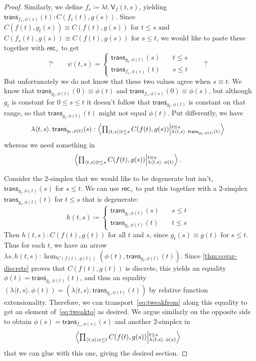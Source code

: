 \documentclass{amsart}
\theoremstyle{plain}
\theoremstyle{definition}
\theoremstyle{remark}
\numberwithin{equation}{section}
\newcommand{\exten}[4]{\left\langle\mathchoice{\textstyle\prod_{#1}}{\textstyle\prod_{#1}}{\scriptstyle\prod_{#1}}{\scriptscriptstyle\prod_{#1}} #2 \middle|^{#3}_{#4}\right\rangle}
\newcommand{\jdeq}{\equiv}
\newcommand{\defeq}{\coloneqq}
\newcommand{\pair}[1]{\langle #1\rangle}
\newcommand{\rec}{\mathsf{rec}}
\newcommand{\connmax}[1]{\mathsf{V}_{#1}}
\newcommand{\lam}[1]{\lambda #1.\,}
\newcommand{\istrans}[2]{\mathsf{trans}_{#1,#2}}
\newcommand{\maybe}[1]{\text{?`}\qquad #1 \qquad \text{?}}
\begin{document}
\begin{proof}
  Similarly, we define $f_s \defeq \lam{t} \connmax f(t,s)$, yielding $\istrans{f_s}{\phi(s)}(t): C(f_s(t),g(s))$.
Since $C(f(t),g_t(s)) \jdeq C(f(t),g(s))$ for $t\le s$ and $C(f_s(t),g(s)) \jdeq C(f(t),g(s))$ for $s\le t$, we would like to paste these together with $\rec_\lor$ to get
  \[ \maybe{\psi(t,s) =
  \begin{cases}
    \istrans{g_t}{\phi(t)}(s) &\quad t\le s\\
    \istrans{f_s}{\phi(s)}(t) &\quad s\le t
  \end{cases}}
  \]
  But unfortunately we do not know that these two values agree when $s\jdeq t$.
  We know that $\istrans{g_t}{\phi(t)}(0) \jdeq \phi(t)$ and $\istrans{f_s}{\phi(s)}(0)\jdeq \phi(s)$, but although $g_t$ is constant for $0\le s\le t$ it doesn't follow that $\istrans{g_t}{\phi(t)}$ is constant on that range, so that $\istrans{g_t}{\phi(t)}(t)$ might not equal $\phi(t)$.
  Put differently, we have
  \begin{equation}
    \lam{\pair{t,s}} \istrans{g_t}{\phi(t)}(s) : \exten{\pair{t,s}\mid t\le s}{C(f(t),g(s))}{t\jdeq s}{\lam{\pair{t,s}}\istrans{g_t}{\phi(t)}(t)}\label{eq:tweakfrom}
  \end{equation}
  whereas we need something in
  \begin{equation}
    \exten{\pair{t,s}\mid t\le s}{C(f(t),g(s))}{t\jdeq s}{\lam{\pair{t,s}}\phi(t)}.\label{eq:tweakto}
  \end{equation}

  Consider the 2-simplex that we would like to be degenerate but isn't, $\istrans{g_t}{\phi(t)}(s)$ for $s\le t$.
  We can use $\rec_\lor$ to put this together with a 2-simplex $\istrans{g_t}{\phi(t)}(t)$ for $t \le s$ that is degenerate:
  \[
  h(t,s) \defeq
  \begin{cases}
    \istrans{g_t}{\phi(t)}(s)&\quad s\le t\\
    \istrans{g_t}{\phi(t)}(t) &\quad t\le s
  \end{cases}
  \]
  Then $h(t,s) : C(f(t),g(t))$ for all $t$ and $s$, since $g_t(s)\jdeq g(t)$ for $s\le t$.
  Thus for each $t$, we have an arrow $\lam{s} h(t,s) : \hom_{C(f(t),g(t))}(\phi(t),\istrans{g_t}{\phi(t)}(t))$.
  Since \cref{thm:covar-discrete} proves that $C(f(t),g(t))$ is discrete, this yields an equality $\phi(t) = \istrans{g_t}{\phi(t)}(t)$, and thus  an equality $(\lam{\pair{t,s}}\phi(t)) = (\lam{\pair{t,s}}\istrans{g_t}{\phi(t)}(t))$ by relative function extensionality.
  Therefore, we can transport~\eqref{eq:tweakfrom} along this equality to get an element of~\eqref{eq:tweakto} as desired.
  We argue similarly on the opposite side to obtain $\phi(s)= \istrans{f_s}{\phi(s)}(s)$ and another 2-simplex in
  \[
      \exten{\pair{t,s}\mid s\le t}{C(f(t),g(s))}{t\jdeq s}{\lam{\pair{t,s}}\phi(s)}
      \] that we can glue with this one, giving the desired section.
\end{proof}
\end{document}
